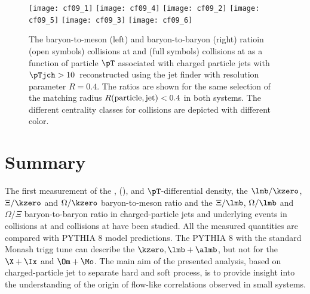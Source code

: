 \documentclass[ALICE,manyauthors]{cernphprep}
\begin{document}
\begin{figure}[!ht]
	\begin{center}
		\texttt{[image: cf09\_1]}
		\texttt{[image: cf09\_4]}
		\texttt{[image: cf09\_2]}
		\texttt{[image: cf09\_5]}
		\texttt{[image: cf09\_3]}
		\texttt{[image: cf09\_6]}
	\end{center}
	\caption{The baryon-to-meson (left) and baryon-to-baryon (right) ratioin \pp (open symbols) collisions at \thirteen and \pPb (full symbols) collisions at \fivenn as a function of particle $\pT$ associated with charged particle jets with $\pTjch > 10$~\GeVc reconstructed using the \akT jet finder with resolution parameter $R = 0.4$. The ratios are shown for the same selection of the matching radius $R(\rm{particle, jet}) < 0.4$ in both systems. The different centrality classes for \pPb collisions are depicted with different color.}
	\label{fig:pppPbRatio}
\end{figure}






\clearpage
\section{Summary}%
\label{sec:Summary}

The first measurement of the \kzero, \lmb (\almb), \Xis and \Oms $\pT$-differential density, the $\lmb/\kzero$, $\Xi/\kzero$ and $\Omega/\kzero$ baryon-to-meson ratio and the $\Xi/\lmb$, $\Omega/\lmb$ and $\Omega/\Xi$ baryon-to-baryon ratio in charged-particle jets and underlying events in \pp collisions at \thirteen and \pPb collisions at \fivenn have been studied.
All the measured quantities are compared with PYTHIA 8 model predictions.
The PYTHIA 8 with the standard Monash trigg tune can describe the $\kzero, \lmb + \almb$, but not for the $\X + \Ix$ and $\Om + \Mo$.
The main aim of the presented analysis, based on charged-particle jet to separate hard and soft process, is to provide insight into the understanding of the origin of flow-like correlations observed in small systems.
\end{document}
